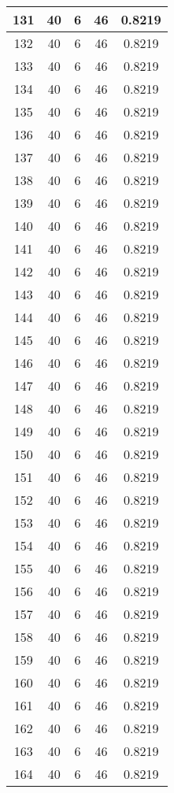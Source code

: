 \documentclass[letterpaper, 12pt]{article}
\begin{document}
\begin{longtable}{|c|c|c|c|c|}
\hline
131 & 40 & 6 & 46 & 0.8219 \\
\hline
132 & 40 & 6 & 46 & 0.8219 \\
\hline
133 & 40 & 6 & 46 & 0.8219 \\
\hline
134 & 40 & 6 & 46 & 0.8219 \\
\hline
135 & 40 & 6 & 46 & 0.8219 \\
\hline
136 & 40 & 6 & 46 & 0.8219 \\
\hline
137 & 40 & 6 & 46 & 0.8219 \\
\hline
138 & 40 & 6 & 46 & 0.8219 \\
\hline
139 & 40 & 6 & 46 & 0.8219 \\
\hline
140 & 40 & 6 & 46 & 0.8219 \\
\hline
141 & 40 & 6 & 46 & 0.8219 \\
\hline
142 & 40 & 6 & 46 & 0.8219 \\
\hline
143 & 40 & 6 & 46 & 0.8219 \\
\hline
144 & 40 & 6 & 46 & 0.8219 \\
\hline
145 & 40 & 6 & 46 & 0.8219 \\
\hline
146 & 40 & 6 & 46 & 0.8219 \\
\hline
147 & 40 & 6 & 46 & 0.8219 \\
\hline
148 & 40 & 6 & 46 & 0.8219 \\
\hline
149 & 40 & 6 & 46 & 0.8219 \\
\hline
150 & 40 & 6 & 46 & 0.8219 \\
\hline
151 & 40 & 6 & 46 & 0.8219 \\
\hline
152 & 40 & 6 & 46 & 0.8219 \\
\hline
153 & 40 & 6 & 46 & 0.8219 \\
\hline
154 & 40 & 6 & 46 & 0.8219 \\
\hline
155 & 40 & 6 & 46 & 0.8219 \\
\hline
156 & 40 & 6 & 46 & 0.8219 \\
\hline
157 & 40 & 6 & 46 & 0.8219 \\
\hline
158 & 40 & 6 & 46 & 0.8219 \\
\hline
159 & 40 & 6 & 46 & 0.8219 \\
\hline
160 & 40 & 6 & 46 & 0.8219 \\
\hline
161 & 40 & 6 & 46 & 0.8219 \\
\hline
162 & 40 & 6 & 46 & 0.8219 \\
\hline
163 & 40 & 6 & 46 & 0.8219 \\
\hline
164 & 40 & 6 & 46 & 0.8219 \\

\end{longtable}
\end{document}
